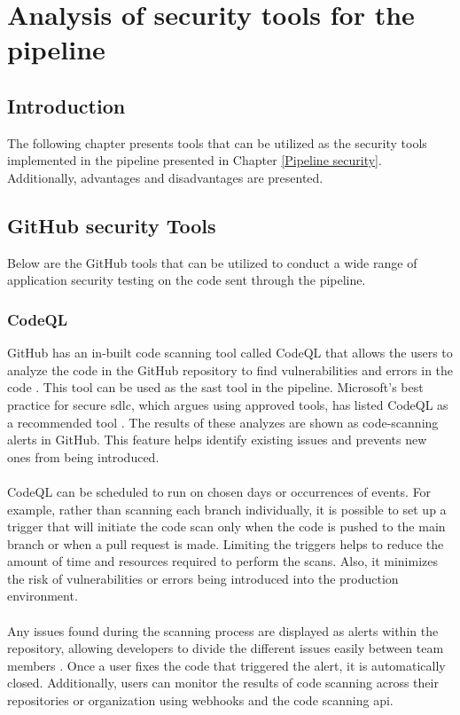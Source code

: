 \newpage
\thispagestyle{empty}
\mbox{}

\chapter{Analysis of security tools for the pipeline}
\label{chap:Tools}

\section{Introduction}
The following chapter presents tools that can be utilized as the security tools implemented in the \gls{pipeline} presented in Chapter \ref{Pipeline security}. Additionally, advantages and disadvantages are presented.  


\section{GitHub security Tools}
Below are the GitHub tools that can be utilized to conduct a wide range of application security testing on the code sent through the pipeline. 

\subsection{CodeQL}
\label{codeql1}
GitHub has an in-built code scanning tool called CodeQL that allows the users to analyze the code in the GitHub repository to find vulnerabilities and errors in the code \cite{CodeQL1}. This tool can be used as the \acrshort{sast} tool in the \gls{pipeline}. Microsoft's best practice for secure \acrshort{sdlc}, which  argues using approved tools, has listed CodeQL as a recommended tool \cite{microsoftSDLCpractices}. The results of these analyzes are shown as code-scanning alerts in GitHub. This feature helps identify existing issues and prevents new ones from being introduced. 
\\~\\
CodeQL can be scheduled to run on chosen days or occurrences of events. For example, rather than scanning each branch individually, it is possible to set up a trigger that will initiate the code scan only when the code is pushed to the main branch or when a pull request is made. Limiting the triggers helps to reduce the amount of time and resources required to perform the scans. Also, it minimizes the risk of vulnerabilities or errors being introduced into the production environment.
\\~\\
Any issues found during the scanning process are displayed as alerts within the repository, allowing developers to divide the different issues easily between team members \cite{GithubCodeScanning}. Once a user fixes the code that triggered the alert, it is automatically closed. Additionally, users can monitor the results of code scanning across their repositories or organization using webhooks and the code scanning \acrshort{api}. 

